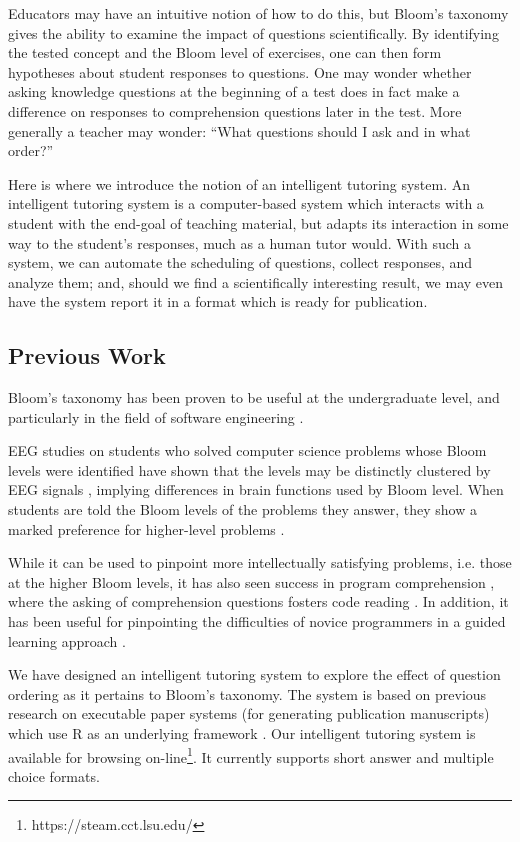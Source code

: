 \documentclass[a4paper,twocolumn]{article}
\begin{document}
Educators may have an intuitive notion of how to do this, but Bloom's taxonomy
gives the ability to examine the impact of questions scientifically.  By
identifying the tested concept and the Bloom level of exercises, one can then
form hypotheses about student responses to questions.  One may wonder whether
asking knowledge questions at the beginning of a test does in fact make a
difference on responses to comprehension questions later in the test.  More
generally a teacher may wonder: ``What questions should I ask and in what
order?''

Here is where we introduce the notion of an intelligent tutoring system.  An
intelligent tutoring system is a computer-based system which interacts with a
student with the end-goal of teaching material, but adapts its interaction in
some way to the student's responses, much as a human tutor would.  With such a
system, we can automate the scheduling of questions, collect responses, and
analyze them; and, should we find a scientifically interesting result, we may
even have the system report it in a format which is ready for publication.

\subsection{Previous Work}

Bloom's taxonomy has been proven to be useful at the undergraduate level, and
particularly in the field of software engineering \cite{britto2015}
\cite{mahmood2014}.

EEG studies on students who solved computer science problems whose Bloom levels
were identified have shown that the levels may be distinctly clustered by EEG
signals \cite{chatterjee2015}, implying differences in brain functions used by
Bloom level.  When students are told the Bloom levels of the problems they
answer, they show a marked preference for higher-level problems
\cite{bruyn2011} \cite{goel2004}.

While it can be used to pinpoint more intellectually satisfying problems, i.e.
those at the higher Bloom levels, it has also seen success in program
comprehension \cite{buckley2003}, where the asking of comprehension questions
fosters code reading \cite{losada2008}. In addition, it has been useful for
pinpointing the difficulties of novice programmers in a guided learning
approach \cite{shuhidan2011}.

We have designed an intelligent tutoring system to explore the effect of
question ordering as it pertains to Bloom's taxonomy.  The system is based on
previous research on executable paper systems (for generating publication
manuscripts) which use R as an underlying framework \cite{castleberry2011}.
Our intelligent tutoring system is available for browsing
on-line\footnote{https://steam.cct.lsu.edu/}. It currently supports short
answer and multiple choice formats.
\end{document}
